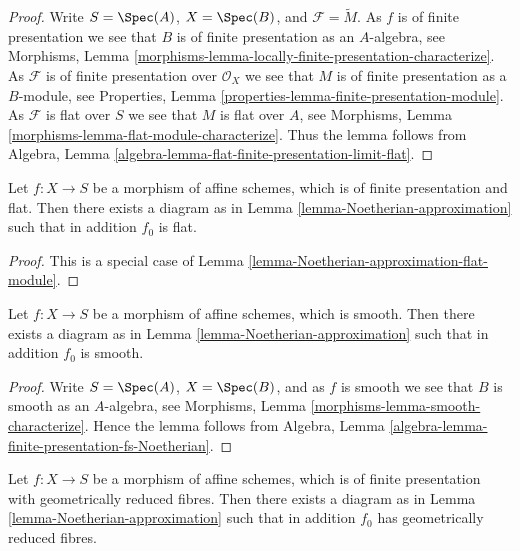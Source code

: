 \begin{proof}
Write $S = \Spec(A)$, $X = \Spec(B)$, and
$\mathcal{F} = \widetilde{M}$. As $f$ is of finite presentation we see that
$B$ is of finite presentation as an $A$-algebra, see
Morphisms,
Lemma \ref{morphisms-lemma-locally-finite-presentation-characterize}.
As $\mathcal{F}$ is of finite presentation over $\mathcal{O}_X$ we see that
$M$ is of finite presentation as a $B$-module, see
Properties, Lemma \ref{properties-lemma-finite-presentation-module}.
As $\mathcal{F}$ is flat over $S$ we see that $M$ is flat over $A$, see
Morphisms, Lemma \ref{morphisms-lemma-flat-module-characterize}.
Thus the lemma follows from
Algebra, Lemma \ref{algebra-lemma-flat-finite-presentation-limit-flat}.
\end{proof}

\begin{lemma}
\label{lemma-Noetherian-approximation-flat}
Let $f : X \to S$ be a morphism of affine schemes, which is of finite
presentation and flat. Then there exists a diagram as in
Lemma \ref{lemma-Noetherian-approximation}
such that in addition $f_0$ is flat.
\end{lemma}

\begin{proof}
This is a special case of
Lemma \ref{lemma-Noetherian-approximation-flat-module}.
\end{proof}

\begin{lemma}
\label{lemma-Noetherian-approximation-smooth}
Let $f : X \to S$ be a morphism of affine schemes, which is smooth.
Then there exists a diagram as in
Lemma \ref{lemma-Noetherian-approximation}
such that in addition $f_0$ is smooth.
\end{lemma}

\begin{proof}
Write $S = \Spec(A)$, $X = \Spec(B)$, and
as $f$ is smooth we see that $B$ is smooth as an $A$-algebra, see
Morphisms,
Lemma \ref{morphisms-lemma-smooth-characterize}.
Hence the lemma follows from
Algebra, Lemma \ref{algebra-lemma-finite-presentation-fs-Noetherian}.
\end{proof}

\begin{lemma}
\label{lemma-Noetherian-approximation-geometrically-reduced}
Let $f : X \to S$ be a morphism of affine schemes, which is
of finite presentation with geometrically reduced fibres.
Then there exists a diagram as in
Lemma \ref{lemma-Noetherian-approximation}
such that in addition $f_0$ has geometrically reduced fibres.
\end{lemma}

